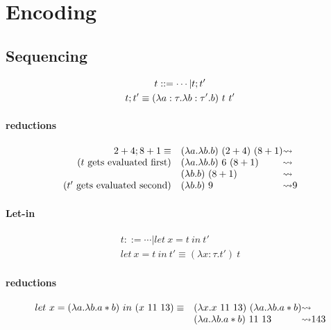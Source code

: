 \documentclass{article}
\newcommand{\lam}[2]{\ensuremath{\lambda#1.#2}}
\begin{document}
\section{Encoding}
\subsection{Sequencing}
\begin{gather*}
    t ::= \cdots | t;t' \\
    t;t' \equiv (\lam{a:\tau}\lam{b:\tau'}{b})\ t\ t'
\end{gather*}
\paragraph{reductions}
\begin{align*}
    \begin{array}{r l @{\leadsto}l}
        2+4 ; 8+1 \equiv & (\lam{a}\lam{b}{b})\ (2+4)\ (8+1) \\
        (t\ \text{gets evaluated first})    & (\lam{a}\lam{b}{b})\ 6\ (8+1) \\
                                            & (\lam{b}{b})\ (8+1) \\
        (t'\ \text{gets evaluated second})  & (\lam{b}{b})\ 9 & 9
    \end{array}
\end{align*}

\paragraph{Let-in}
\begin{gather*}
    t ::= \cdots | let\ x=t\ in\ t' \\
    let\ x=t\ in\ t' \equiv (\lam{x:\tau}{t'})\ t
\end{gather*}
\paragraph{reductions}
\begin{align*}
    \begin{array}{r l @{\leadsto}l}
        let\ x=(\lam{a}\lam{b}{a*b})\ in\ (x\ 11\ 13) \equiv & (\lam{x}{x\ 11\ 13})\ (\lam{a}\lam{b}{a*b}) \\
                                                           & (\lam{a}\lam{b}{a*b})\ 11\ 13 & 143 
    \end{array}
\end{align*}
\end{document}
